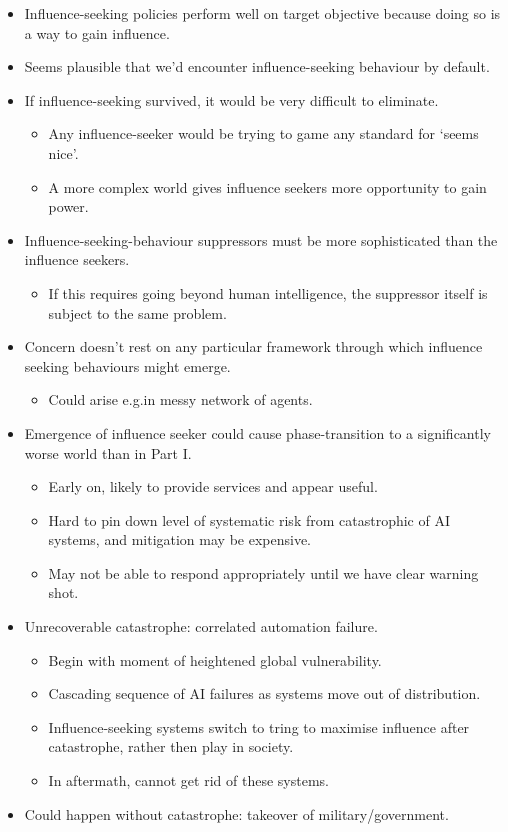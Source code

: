 \begin{itemize}
    \item Influence-seeking policies perform well on target objective because doing so is a way to gain influence.
    \item Seems plausible that we'd encounter influence-seeking behaviour by default.
    \item If influence-seeking survived, it would be very difficult to eliminate.
    \begin{itemize}
        \item Any influence-seeker would be trying to game any standard for `seems nice'.
        \item A more complex world gives influence seekers more opportunity to gain power.
    \end{itemize}
    \item Influence-seeking-behaviour suppressors must be more sophisticated than the influence seekers.
    \begin{itemize}
        \item If this requires going beyond human intelligence, the suppressor itself is subject to the same problem.
    \end{itemize}
    \item Concern doesn't rest on any particular framework through which influence seeking behaviours might emerge.
    \begin{itemize}
        \item Could arise e.g.\@ in messy network of agents.
    \end{itemize}
    \item Emergence of influence seeker could cause phase-transition to a significantly worse world than in Part I.
    \begin{itemize}
        \item Early on, likely to provide services and appear useful.
        \item Hard to pin down level of systematic risk from catastrophic of AI systems, and mitigation may be expensive.
        \item May not be able to respond appropriately until we have clear warning shot.
    \end{itemize}
    \item Unrecoverable catastrophe: correlated automation failure.
    \begin{itemize}
        \item Begin with moment of heightened global vulnerability.
        \item Cascading sequence of AI failures as systems move out of distribution.
        \item Influence-seeking systems switch to tring to maximise influence after catastrophe, rather then play in society.
        \item In aftermath, cannot get rid of these systems.
    \end{itemize}
    \item Could happen without catastrophe: takeover of military/government.
\end{itemize}


